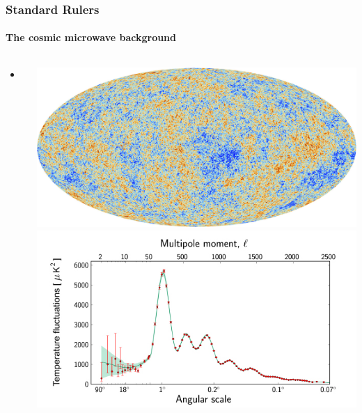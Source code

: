 \documentclass[aspectratio=169]{beamer}
\begin{document}
\begin{frame}
    \frametitle{Standard Rulers}
    \framesubtitle{The cosmic microwave background}
    \begin{columns}
        \begin{itemize}
            \item <+CMB+>
        \end{itemize}
        \includegraphics[width=\textwidth]{figures/cmb.png}
        \includegraphics[width=\textwidth]{figures/cmb_power_spectrum.jpg}%
    \end{columns}
\end{frame}
\end{document}
